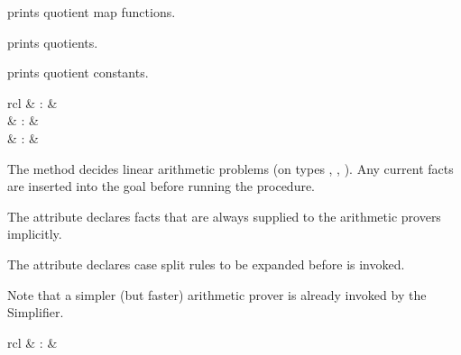 \begin{isabellebody}
\begin{isamarkuptext}
\begin{description}
  \item \hyperlink{command.HOL.print-quotmaps}{\mbox{}} prints quotient map functions.

  \item \hyperlink{command.HOL.print-quotients}{\mbox{}} prints quotients.

  \item \hyperlink{command.HOL.print-quotconsts}{\mbox{}} prints quotient constants.

  \end{description}%
\end{isamarkuptext}%
\isamarkuptrue%
%
\isamarkuptrue%
%
\begin{isamarkuptext}%
\begin{matharray}{rcl}
    \hypertarget{method.HOL.arith}{\hyperlink{method.HOL.arith}{\mbox{}}} & : &  \\
    \hypertarget{attribute.HOL.arith}{\hyperlink{attribute.HOL.arith}{\mbox{}}} & : &  \\
    \hypertarget{attribute.HOL.arith-split}{\hyperlink{attribute.HOL.arith-split}{\mbox{}}} & : &  \\
  \end{matharray}

  The \hyperlink{method.HOL.arith}{\mbox{}} method decides linear arithmetic problems
  (on types , , ).  Any current
  facts are inserted into the goal before running the procedure.

  The \hyperlink{attribute.HOL.arith}{\mbox{}} attribute declares facts that are
  always supplied to the arithmetic provers implicitly.

  The \hyperlink{attribute.HOL.arith-split}{\mbox{}} attribute declares case split
  rules to be expanded before \hyperlink{method.HOL.arith}{\mbox{}} is invoked.

  Note that a simpler (but faster) arithmetic prover is
  already invoked by the Simplifier.%
\end{isamarkuptext}%
\isamarkuptrue%
%
\isamarkuptrue%
%
\begin{isamarkuptext}%
\begin{matharray}{rcl}
    \hypertarget{method.HOL.iprover}{\hyperlink{method.HOL.iprover}{\mbox{}}} & : &  \\
  \end{matharray}


\end{isamarkuptext}
\end{isabellebody}
